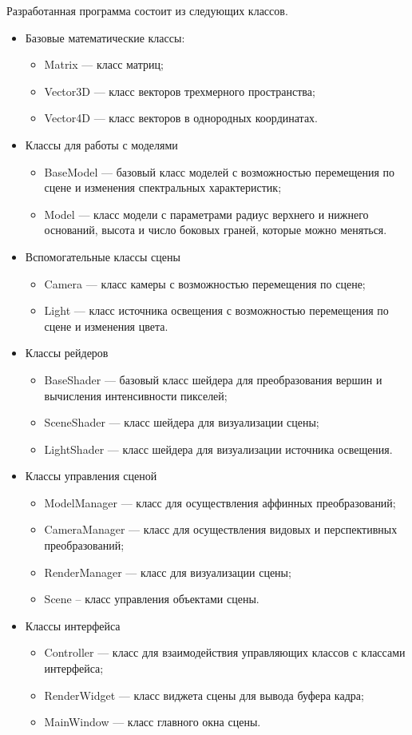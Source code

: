 Разработанная программа состоит из следующих классов.
\begin{itemize}
	\item Базовые математические классы:
	\begin{itemize}
		\item Matrix --- класс матриц;
		\item Vector3D --- класс векторов трехмерного пространства;
		\item Vector4D --- класс векторов в однородных координатах.
	\end{itemize}
	\item Классы для работы с моделями
	\begin{itemize}
		\item BaseModel --- базовый класс моделей с возможностью перемещения по сцене и изменения спектральных характеристик;
		\item Model --- класс модели с параметрами радиус верхнего и нижнего оснований, высота и число боковых граней, которые можно меняться.
	\end{itemize}
	\item Вспомогательные классы сцены
	\begin{itemize}
		\item Camera --- класс камеры с возможностью перемещения по сцене;
		\item Light --- класс источника освещения с возможностью перемещения по сцене и изменения цвета.
	\end{itemize}
	\item Классы рейдеров
	\begin{itemize}
		\item BaseShader --- базовый класс шейдера для преобразования вершин и вычисления интенсивности пикселей;
		\item SceneShader --- класс шейдера для визуализации сцены;
		\item LightShader --- класс шейдера для визуализации источника освещения.
	\end{itemize}
	\item Классы управления сценой
	\begin{itemize}
		\item ModelManager --- класс для осуществления аффинных преобразований;
		\item CameraManager --- класс для осуществления видовых и перспективных преобразований;
		\item RenderManager --- класс для визуализации сцены;
		\item Scene – класс управления объектами сцены.
	\end{itemize}
	\item Классы интерфейса
	\begin{itemize}
		\item Controller --- класс для взаимодействия управляющих классов с классами интерфейса;
		\item RenderWidget --- класс виджета сцены для вывода буфера кадра;
		\item MainWindow --- класс главного окна сцены.
	\end{itemize}
\end{itemize}

